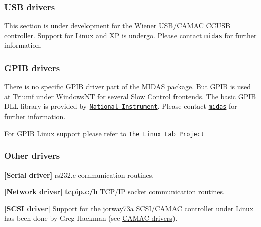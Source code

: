 \label{FE_Hardware_idx_Hardware_drivers_USB}
\hypertarget{FE_Hardware_idx_Hardware_drivers_USB}{}
 

 \hypertarget{FE_Hardware_USB_drivers}{}\subsubsection{USB drivers}\label{FE_Hardware_USB_drivers}
This section is under development for the Wiener USB/CAMAC CCUSB controller. Support for Linux and XP is undergo. Please contact \href{mailto:midas@psi.ch, midas@triumf.ca?subject=USB driver}{\tt midas} for further information.

\label{FE_Hardware_idx_Hardware_drivers_GPIB}
\hypertarget{FE_Hardware_idx_Hardware_drivers_GPIB}{}
 

 \hypertarget{FE_Hardware_GPIB_drivers}{}\subsubsection{GPIB drivers}\label{FE_Hardware_GPIB_drivers}
There is no specific GPIB driver part of the MIDAS package. But GPIB is used at Triumf under WindowsNT for several Slow Control frontends. The basic GPIB DLL library is provided by \href{http://www.ni.com/default.htm}{\tt National Instrument}. Please contact \href{mailto:midas@triumf.ca?subject=GPIB driver}{\tt midas} for further information.

For GPIB Linux support please refer to \href{http://www.llp.fu-berlin.de/pool/software/busses/}{\tt The Linux Lab Project}

\label{FE_Hardware_idx_Hardware_drivers_other}
\hypertarget{FE_Hardware_idx_Hardware_drivers_other}{}
 

 \hypertarget{FE_Hardware_Other_drivers}{}\subsubsection{Other drivers}\label{FE_Hardware_Other_drivers}

\begin{DoxyItemize}
\item {\bfseries \mbox{[}Serial driver\mbox{]}} rs232.c communication routines.
\item {\bfseries \mbox{[}Network driver\mbox{]}} {\bfseries tcpip.c/h} TCP/IP socket communication routines.
\item {\bfseries \mbox{[}SCSI driver\mbox{]}} Support for the jorway73a SCSI/CAMAC controller under Linux has been done by Greg Hackman (see \hyperlink{FE_Hardware_CAMAC_drivers}{CAMAC drivers}).
\end{DoxyItemize}

